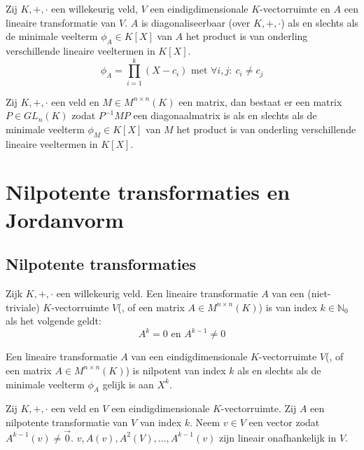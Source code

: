 \documentclass[main.tex]{subfiles}
\begin{document}
\begin{st}
  Zij $K,+,\cdot$ een willekeurig veld, $V$ een eindigdimensionale $K$-vectorruimte en $A$ een lineaire transformatie van $V$.
  $A$ is diagonaliseerbaar (over $K,+,\cdot$) als en slechts als de minimale veelterm $\phi_{A}\in K[X]$ van $A$ het product is van onderling verschillende lineaire veeltermen in $K[X]$.
  \[ \phi_{A} = \prod_{i=1}^{k}(X-c_{i}) \text{ met } \forall i,j:\ c_{i} \neq c_{j} \]
\end{st}

\begin{ei}
  Zij $K,+,\cdot$ een veld en $M\in M^{n\times n}(K)$ een matrix, dan bestaat er een matrix $P \in GL_{n}(K)$ zodat $P^{-1}MP$ een diagonaalmatrix is als en slechts als de minimale veelterm $\phi_{M}\in K[X]$ van $M$ het product is van onderling verschillende lineaire veeltermen in $K[X]$.
\end{ei}

\section{Nilpotente transformaties en Jordanvorm}
\label{sec:nilp-transf-en}

\subsection{Nilpotente transformaties}
\label{sec:nilp-transf}

\begin{de}
  Zijk $K,+,\cdot$ een willekeurig veld.
  Een lineaire transformatie $A$ van een (niet-triviale) $K$-vectorruimte $V$(, of een matrix $A\in M^{n\times n}(K)$) is  van index $k\in \mathbb{N}_{0}$ als het volgende geldt:
  \[ A^{k} = 0 \text{ en } A^{k-1} \neq 0 \]
\end{de}

\begin{ei}
  Een lineaire transformatie $A$ van een eindigdimensionale $K$-vectorruimte $V$(, of een matrix $A\in M^{n\times n}(K)$) is nilpotent van index $k$ als en slechts als de minimale veelterm $\phi_{A}$ gelijk is aan $X^{k}$.
\end{ei}

\begin{ei}
  Zij $K,+,\cdot$ een veld en $V$ een eindigdimensionale $K$-vectorruimte.
  Zij $A$ een nilpotente transformatie van $V$ van index $k$.
  Neem $v\in V$ een vector zodat $A^{k-1}(v) \neq \vec{0}$.
  $v, A(v), A^{2}(V), \dotsc, A^{k-1}(v)$ zijn lineair onafhankelijk in $V$.
\end{ei}
\end{document}
